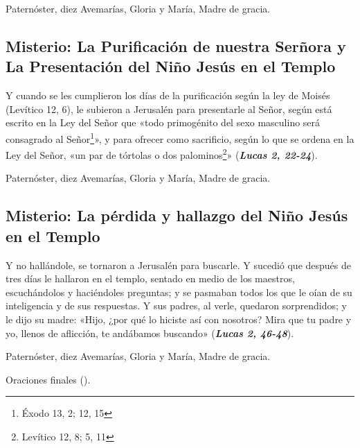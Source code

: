 \documentclass[./main.tex]{subfiles}
\newcounter{joyful-counter}
\begin{document}
\begin{center}
      Paternóster, diez Avemarías, Gloria y María, Madre de gracia.
\end{center}

\subsection*{ Misterio: La Purificación de nuestra Serñora y La Presentación del Niño Jesús en el Templo}

Y cuando se les cumplieron los días de la purificación según la ley de Moisés (Levítico 12, 6),
le subieron a Jerusalén para presentarle al Señor, según está escrito en la Ley del Señor que «todo primogénito
del sexo masculino será consagrado al Señor\footnote{Éxodo 13, 2; 12, 15}», y para ofrecer como sacrificio,
según lo que se ordena en la Ley del Señor, «un par de tórtolas o dos palominos\footnote{Levítico 12, 8; 5, 11}» (\textbf{\emph{Lucas 2, 22-24}}).

\begin{center}
      Paternóster, diez Avemarías, Gloria y María, Madre de gracia.
\end{center}

\subsection*{ Misterio: La pérdida y hallazgo del Niño Jesús en el Templo}

Y no hallándole, se tornaron a Jerusalén para buscarle. Y sucedió que después de tres días le hallaron en el templo,
sentado en medio de los maestros, escuchándolos y haciéndoles preguntas; y se pasmaban todos los que le oían de su
inteligencia y de sus respuestas. Y sus padres, al verle, quedaron sorprendidos; y le dijo su madre:
«Hijo, ¿por qué lo hiciste así con nosotros? Mira que tu padre y yo, llenos de aflicción, te andábamos buscando» (\textbf{\emph{Lucas 2, 46-48}}).

\begin{center}
      Paternóster, diez Avemarías, Gloria y María, Madre de gracia.
      
      Oraciones finales ().
\end{center}

\end{document}
